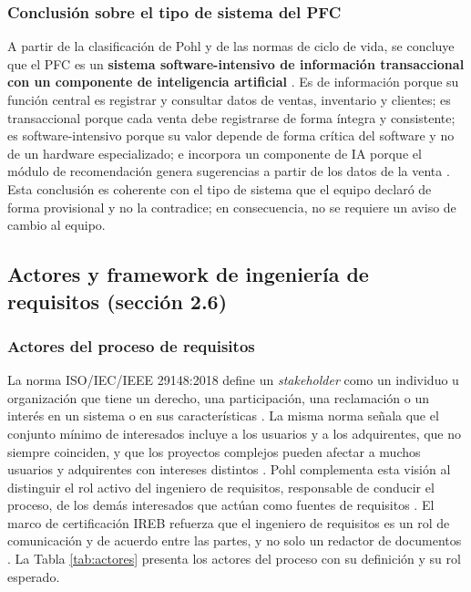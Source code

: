 \documentclass[onecolumn,12pt]{IEEEtran}
\begin{document}
\subsubsection{Conclusi\'on sobre el tipo de sistema del PFC}
A partir de la clasificaci\'on de Pohl y de las normas de ciclo de vida, se concluye que el PFC es un \textbf{sistema software-intensivo de informaci\'on transaccional con un componente de inteligencia artificial} \cite{pohl2025,iso15288,iso12207}. Es de informaci\'on porque su funci\'on central es registrar y consultar datos de ventas, inventario y clientes; es transaccional porque cada venta debe registrarse de forma \'integra y consistente; es software-intensivo porque su valor depende de forma cr\'itica del software y no de un hardware especializado; e incorpora un componente de IA porque el m\'odulo de recomendaci\'on genera sugerencias a partir de los datos de la venta \cite{pohl2025,swebok4}. Esta conclusi\'on es coherente con el tipo de sistema que el equipo declar\'o de forma provisional y no la contradice; en consecuencia, no se requiere un aviso de cambio al equipo.

\subsection{Actores y framework de ingenier\'ia de requisitos (secci\'on 2.6)}

\subsubsection{Actores del proceso de requisitos}
La norma ISO/IEC/IEEE 29148:2018 define un \emph{stakeholder} como un individuo u organizaci\'on que tiene un derecho, una participaci\'on, una reclamaci\'on o un inter\'es en un sistema o en sus caracter\'isticas \cite{iso29148}. La misma norma se\~nala que el conjunto m\'inimo de interesados incluye a los usuarios y a los adquirentes, que no siempre coinciden, y que los proyectos complejos pueden afectar a muchos usuarios y adquirentes con intereses distintos \cite{iso29148}. Pohl complementa esta visi\'on al distinguir el rol activo del ingeniero de requisitos, responsable de conducir el proceso, de los dem\'as interesados que act\'uan como fuentes de requisitos \cite{pohl2025}. El marco de certificaci\'on IREB refuerza que el ingeniero de requisitos es un rol de comunicaci\'on y de acuerdo entre las partes, y no solo un redactor de documentos \cite{ireb2023}. La Tabla \ref{tab:actores} presenta los actores del proceso con su definici\'on y su rol esperado.
\end{document}

